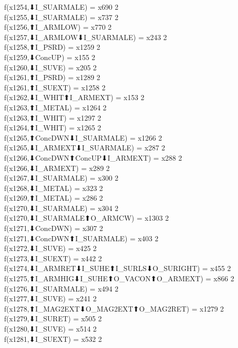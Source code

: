 f(x1254,⬇I_SUARMALE) = x690 {2} \\
f(x1255,⬇I_SUARMALE) = x737 {2} \\
f(x1256,⬆I_ARMLOW) = x770 {2} \\
f(x1257,⬇I_ARMLOW⬇I_SUARMALE) = x243 {2} \\
f(x1258,⬆I_PSRD) = x1259 {2} \\
f(x1259,⬇ConcUP) = x155 {2} \\
f(x1260,⬇I_SUVE) = x205 {2} \\
f(x1261,⬆I_PSRD) = x1289 {2} \\
f(x1261,⬆I_SUEXT) = x1258 {2} \\
f(x1262,⬇I_WHIT⬆I_ARMEXT) = x153 {2} \\
f(x1263,⬆I_METAL) = x1264 {2} \\
f(x1263,⬆I_WHIT) = x1297 {2} \\
f(x1264,⬆I_WHIT) = x1265 {2} \\
f(x1265,⬆ConcDWN⬇I_SUARMALE) = x1266 {2} \\
f(x1265,⬇I_ARMEXT⬇I_SUARMALE) = x287 {2} \\
f(x1266,⬇ConcDWN⬆ConcUP⬇I_ARMEXT) = x288 {2} \\
f(x1266,⬇I_ARMEXT) = x289 {2} \\
f(x1267,⬇I_SUARMALE) = x300 {2} \\
f(x1268,⬇I_METAL) = x323 {2} \\
f(x1269,⬆I_METAL) = x286 {2} \\
f(x1270,⬇I_SUARMALE) = x304 {2} \\
f(x1270,⬇I_SUARMALE⬆O_ARMCW) = x1303 {2} \\
f(x1271,⬇ConcDWN) = x307 {2} \\
f(x1271,⬇ConcDWN⬆I_SUARMALE) = x403 {2} \\
f(x1272,⬇I_SUVE) = x425 {2} \\
f(x1273,⬇I_SUEXT) = x442 {2} \\
f(x1274,⬇I_ARMRET⬇I_SUHE⬆I_SURLS⬇O_SURIGHT) = x455 {2} \\
f(x1275,⬆I_ARMHIG⬇I_SUHE⬆O_VACON⬆O_ARMEXT) = x866 {2} \\
f(x1276,⬇I_SUARMALE) = x494 {2} \\
f(x1277,⬇I_SUVE) = x241 {2} \\
f(x1278,⬆I_MAG2EXT⬇O_MAG2EXT⬆O_MAG2RET) = x1279 {2} \\
f(x1279,⬇I_SURET) = x505 {2} \\
f(x1280,⬇I_SUVE) = x514 {2} \\
f(x1281,⬇I_SUEXT) = x532 {2} \\
